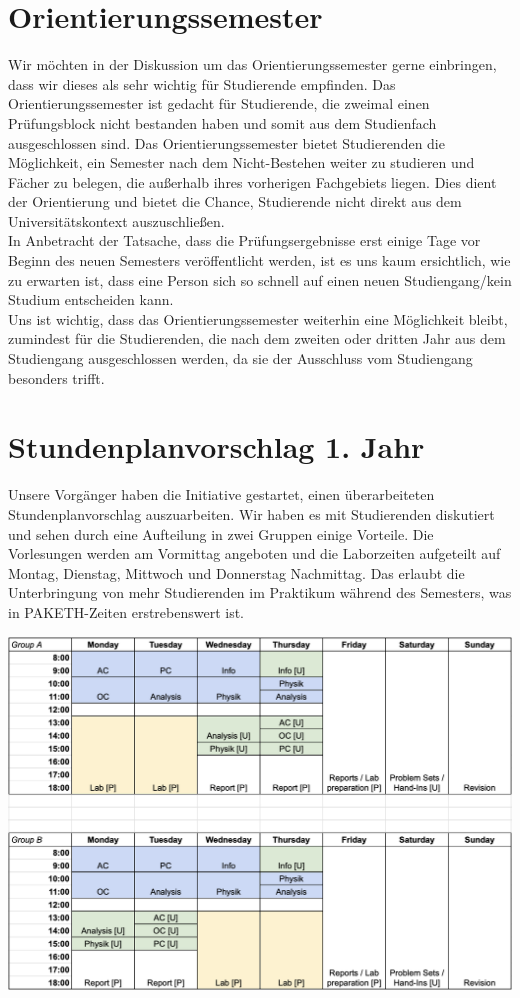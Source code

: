 \documentclass{article}
\begin{document}
\section{Orientierungssemester}
Wir möchten in der Diskussion um das Orientierungssemester gerne einbringen, dass wir dieses als sehr wichtig für Studierende empfinden. Das Orientierungssemester ist gedacht für Studierende, die zweimal einen Prüfungsblock nicht bestanden haben und somit aus dem Studienfach ausgeschlossen sind. Das Orientierungssemester bietet Studierenden die Möglichkeit, ein Semester nach dem Nicht-Bestehen weiter zu studieren und Fächer zu belegen, die außerhalb ihres vorherigen Fachgebiets liegen. Dies dient der Orientierung und bietet die Chance, Studierende nicht direkt aus dem Universitätskontext auszuschließen.\\

In Anbetracht der Tatsache, dass die Prüfungsergebnisse erst einige Tage vor Beginn des neuen Semesters veröffentlicht werden, ist es uns kaum ersichtlich, wie zu erwarten ist, dass eine Person sich so schnell auf einen neuen Studiengang/kein Studium entscheiden kann.\\

Uns ist wichtig, dass das Orientierungssemester weiterhin eine Möglichkeit bleibt, zumindest für die Studierenden, die nach dem zweiten oder dritten Jahr aus dem Studiengang ausgeschlossen werden, da sie der Ausschluss vom Studiengang besonders trifft.

\newpage
\section{Stundenplanvorschlag 1. Jahr}
Unsere Vorgänger haben die Initiative gestartet, einen überarbeiteten Stundenplanvorschlag auszuarbeiten. Wir haben es mit Studierenden diskutiert und sehen durch eine Aufteilung in zwei Gruppen einige Vorteile. Die Vorlesungen werden am Vormittag angeboten und die Laborzeiten aufgeteilt auf Montag, Dienstag, Mittwoch und Donnerstag Nachmittag. Das erlaubt die Unterbringung von mehr Studierenden im Praktikum während des Semesters, was in PAKETH-Zeiten erstrebenswert ist.

\begin{center}
\includegraphics[width=0.9\linewidth]{Graphics/Screenshot 2024-11-08 at 07.54.10.png}
\end{center}
\end{document}
